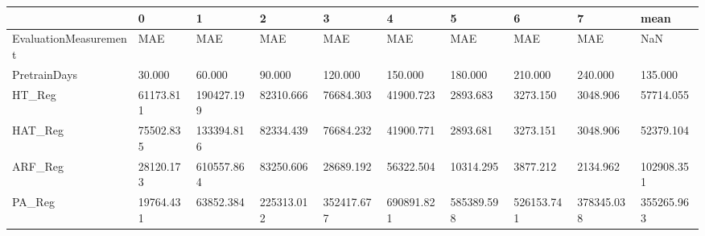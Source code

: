 \begin{tabular}{llllllllll}
\toprule
{} &         0 &          1 &          2 &          3 &          4 &          5 &          6 &          7 &       mean \\
\midrule
EvaluationMeasurement &       MAE &        MAE &        MAE &        MAE &        MAE &        MAE &        MAE &        MAE &        NaN \\
PretrainDays          &    30.000 &     60.000 &     90.000 &    120.000 &    150.000 &    180.000 &    210.000 &    240.000 &    135.000 \\
HT\_Reg                & 61173.811 & 190427.199 &  82310.666 &  76684.303 &  41900.723 &   2893.683 &   3273.150 &   3048.906 &  57714.055 \\
HAT\_Reg               & 75502.835 & 133394.816 &  82334.439 &  76684.232 &  41900.771 &   2893.681 &   3273.151 &   3048.906 &  52379.104 \\
ARF\_Reg               & 28120.173 & 610557.864 &  83250.606 &  28689.192 &  56322.504 &  10314.295 &   3877.212 &   2134.962 & 102908.351 \\
PA\_Reg                & 19764.431 &  63852.384 & 225313.012 & 352417.677 & 690891.821 & 585389.598 & 526153.741 & 378345.038 & 355265.963 \\
\bottomrule
\end{tabular}
